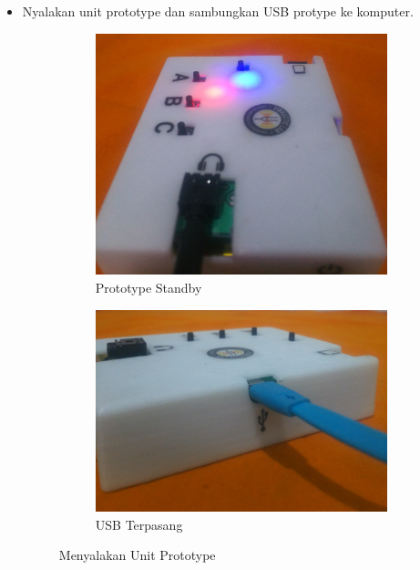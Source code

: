 \documentclass[12pt,]{article}
\begin{document}
	\begin{itemize}
		\item Nyalakan unit prototype dan sambungkan USB protype ke komputer.
		\begin{figure}[!ht]
			\centering
			\begin{subfigure}[b]{0.3\textwidth}
				\includegraphics[width=\textwidth]{images/foto/standby}
				\caption{Prototype Standby}
			\end{subfigure}
			\begin{subfigure}[b]{0.3\textwidth}
				\includegraphics[width=\textwidth]{images/foto/konek}
				\caption{USB Terpasang}
			\end{subfigure}
			\caption{Menyalakan Unit Prototype}
		\end{figure}


\end{itemize}
\end{document}
